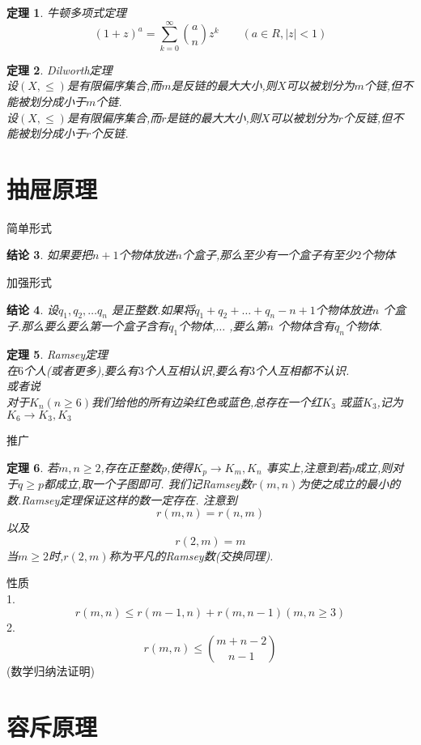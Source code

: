 \documentclass[12pt, a4paper, oneside]{ctexbook}
\newtheorem{theorem}{定理}[section]
\newtheorem{proposition}[theorem]{结论}
\newcommand{\newp}[1]{\vspace{#1\baselineskip}\noindent}
\begin{document}
\begin{theorem}
牛顿多项式定理
  $$
  (1+z)^a=\sum_{k=0}^{\infty} \binom{a}{n} z^k \qquad  (a\in R,|z|<1)
  $$
\end{theorem}

\begin{theorem}
Dilworth定理\\
设$(X,\leq)$是有限偏序集合,而$m$是反链的最大大小,则$X$可以被划分为$m$个链,但不能被划分成小于$m$个链.\\
设$(X,\leq)$是有限偏序集合,而$r$是链的最大大小,则$X$可以被划分为$r$个反链,但不能被划分成小于$r$个反链.
\end{theorem}
\newp{3}
\section{抽屉原理}
简单形式
\begin{proposition}
如果要把$n+1$个物体放进$n$个盒子,那么至少有一个盒子有至少$2$个物体
\end{proposition}
加强形式

\begin{proposition}
设$q_1,q_2,\dots q_n$ 是正整数.如果将$q_1+q_2+\dots +q_n-n+1$个物体放进$n$ 个盒子.那么要么要么第一个盒子含有$q_1$个物体,$\dots$ ,要么第$n$ 个物体含有$q_n$个物体.
\end{proposition}

\begin{theorem}
Ramsey定理\\
在$6$个人(或者更多),要么有$3$个人互相认识,要么有$3$个人互相都不认识.\\
或者说\\
对于$K_n(n \geq 6)$我们给他的所有边染红色或蓝色,总存在一个红$K_3$ 或蓝$K_3$,记为$K_6\rightarrow K_3,K_3$
\end{theorem}

推广 
\begin{theorem}
若$m,n \geq2 $,存在正整数$p$,使得$K_p\rightarrow K_m,K_n $
事实上,注意到若$p$成立,则对于$q\geq p$都成立,取一个子图即可.
我们记Ramsey数$r(m,n)$为使之成立的最小的数.Ramsey定理保证这样的数一定存在.
注意到$$r(m,n)=r(n,m)$$
以及$$r(2,m)=m $$ 当$m\geq2$时,$r(2,m)$称为平凡的Ramsey数(交换同理).
\end{theorem}

性质\\
1. $$r(m,n)\leq r(m-1,n)+r(m,n-1)(m,n \geq 3) $$
2. $$r(m,n)\leq \binom{m+n-2}{n-1} $$(数学归纳法证明)
\newp{3}

\section{容斥原理}
\end{document}
